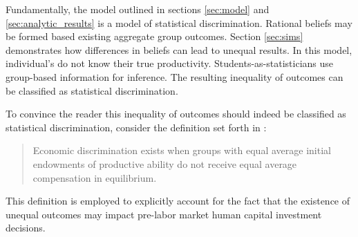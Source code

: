 Fundamentally, the model outlined in sections \ref{sec:model} and \ref{sec:analytic_results} is a model of statistical discrimination. 
Rational beliefs may be formed based existing aggregate group outcomes.
Section \ref{sec:sims} demonstrates how differences in beliefs can lead to unequal results.
In this model, individual's do not know their true productivity. Students-as-statisticians use group-based information for inference. 
The resulting inequality of outcomes can be classified as statistical discrimination. 

To convince the reader this inequality of outcomes should indeed be classified as statistical discrimination, consider the definition set forth in \textcite{LS83}:
\begin{quote}
Economic discrimination exists when groups with equal average initial endowments of productive ability do not receive equal average compensation in equilibrium.
\end{quote}
This definition is employed to explicitly account for the fact that the existence of unequal outcomes may impact pre-labor market human capital investment decisions. 
